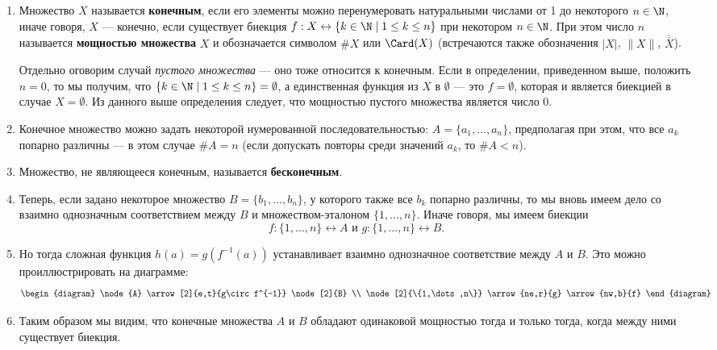 \begin{enumerate}
\item Множество $X$ называется \textbf{конечным}, если его элементы можно перенумеровать натуральными числами от 1 до некоторого $n\in\N$, иначе говоря, $X$ --- конечно, если существует биекция $f:X\leftrightarrow\{k\in\N\mid 1\le k\le n\}$ при некотором $n\in\N$. При этом число $n$ называется \textbf{мощностью множества} $X$ и обозначается символом $\#X$ или $\Card(X)$ (встречаются также обозначения $|X|$, $\|X\|$, $\overline{\overline{X}}$).

Отдельно оговорим случай \textit{пустого множества} --- оно тоже относится к конечным. Если в определении, приведенном выше, положить $n=0$, то мы получим, что $\{k\in\N\mid 1\le k\le n\}=\emptyset$, а единственная функция из $X$ в $\emptyset$ --- это $f=\emptyset$, которая и является биекцией в случае $X=\emptyset$. Из данного выше определения следует, что мощностью пустого множества является число $0$.

\item Конечное множество можно задать некоторой нумерованной последовательностью: $A=\{a_1,\dots,a_n\}$, предполагая при этом, что все $a_k$ попарно различны --- в этом случае $\# A=n$ (если допускать повторы среди значений $a_k$, то $\# A<n$).


\item Множество, не являющееся конечным, называется \textbf{бесконечным}.

\item Теперь, если задано некоторое множество $B=\{b_1,\dots,b_n\}$, у которого также все $b_k$ попарно различны, то мы вновь имеем дело со взаимно однозначным соответствием между $B$ и множеством-эталоном $\{1,\dots, n\}$. Иначе говоря, мы имеем биекции 
$$
f:\{1,\dots, n\}\leftrightarrow A\mbox{ и }g:\{1,\dots, n\}\leftrightarrow B.
$$
\item Но тогда сложная функция $h(a)=g(f^{-1}(a))$ устанавливает взаимно однозначное соответствие между $A$ и $B$. Это можно проиллюстрировать на диаграмме:
\[ \begin{diagram}
\node{A} \arrow[2]{e,t}{g\circ f^{-1}}
\node[2]{B} \\
\node[2]{\{1,\dots,n\}} \arrow{ne,r}{g}
\arrow{nw,b}{f}
\end{diagram}\]

\item Таким образом мы видим, что конечные множества $A$ и $B$ обладают одинаковой мощностью тогда и только тогда, когда между ними существует биекция.


\end{enumerate}
